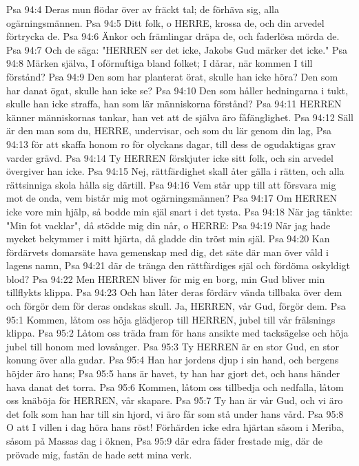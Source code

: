 Psa 94:4  Deras mun flödar över av fräckt tal; de förhäva sig, alla ogärningsmännen.
Psa 94:5  Ditt folk, o HERRE, krossa de, och din arvedel förtrycka de.
Psa 94:6  Änkor och främlingar dräpa de, och faderlösa mörda de.
Psa 94:7  Och de säga: "HERREN ser det icke, Jakobs Gud märker det icke."
Psa 94:8  Märken själva, I oförnuftiga bland folket; I dårar, när kommen I till förstånd?
Psa 94:9  Den som har planterat örat, skulle han icke höra? Den som har danat ögat, skulle han icke se?
Psa 94:10  Den som håller hedningarna i tukt, skulle han icke straffa, han som lär människorna förstånd?
Psa 94:11  HERREN känner människornas tankar, han vet att de själva äro fåfänglighet.
Psa 94:12  Säll är den man som du, HERRE, undervisar, och som du lär genom din lag,
Psa 94:13  för att skaffa honom ro för olyckans dagar, till dess de ogudaktigas grav varder grävd.
Psa 94:14  Ty HERREN förskjuter icke sitt folk, och sin arvedel övergiver han icke.
Psa 94:15  Nej, rättfärdighet skall åter gälla i rätten, och alla rättsinniga skola hålla sig därtill.
Psa 94:16  Vem står upp till att försvara mig mot de onda, vem bistår mig mot ogärningsmännen?
Psa 94:17  Om HERREN icke vore min hjälp, så bodde min själ snart i det tysta.
Psa 94:18  När jag tänkte: "Min fot vacklar", då stödde mig din når, o HERRE:
Psa 94:19  När jag hade mycket bekymmer i mitt hjärta, då gladde din tröst min själ.
Psa 94:20  Kan fördärvets domarsäte hava gemenskap med dig, det säte där man över våld i lagens namn,
Psa 94:21  där de tränga den rättfärdiges själ och fördöma oskyldigt blod?
Psa 94:22  Men HERREN bliver för mig en borg, min Gud bliver min tillflykts klippa.
Psa 94:23  Och han låter deras fördärv vända tillbaka över dem och förgör dem för deras ondskas skull. Ja, HERREN, vår Gud, förgör dem.
Psa 95:1  Kommen, låtom oss höja glädjerop till HERREN, jubel till vår frälsnings klippa.
Psa 95:2  Låtom oss träda fram för hans ansikte med tacksägelse och höja jubel till honom med lovsånger.
Psa 95:3  Ty HERREN är en stor Gud, en stor konung över alla gudar.
Psa 95:4  Han har jordens djup i sin hand, och bergens höjder äro hans;
Psa 95:5  hans är havet, ty han har gjort det, och hans händer hava danat det torra.
Psa 95:6  Kommen, låtom oss tillbedja och nedfalla, låtom oss knäböja för HERREN, vår skapare.
Psa 95:7  Ty han är vår Gud, och vi äro det folk som han har till sin hjord, vi äro får som stå under hans vård.
Psa 95:8  O att I villen i dag höra hans röst! Förhärden icke edra hjärtan såsom i Meriba, såsom på Massas dag i öknen,
Psa 95:9  där edra fäder frestade mig, där de prövade mig, fastän de hade sett mina verk.

